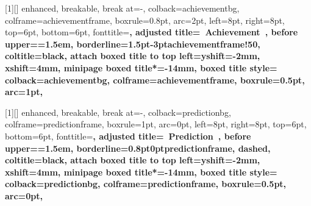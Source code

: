 

[1][]{%
  enhanced,
  breakable,
  break at=-\baselineskip,
  colback=achievementbg,
  colframe=achievementframe,
  boxrule=0.8pt,
  arc=2pt,
  left=8pt,
  right=8pt,
  top=6pt,
  bottom=6pt,
  fonttitle=\bfseries\sffamily,
  adjusted title={\achievementicon~Achievement~\theachievementcounter{}},
  before upper={\parindent=1.5em},
  borderline={1.5pt}{-3pt}{achievementframe!50},
  coltitle=black,
  attach boxed title to top left={yshift=-2mm, xshift=4mm},
  minipage boxed title*=-14mm,
  boxed title style={
    colback=achievementbg,
    colframe=achievementframe,
    boxrule=0.5pt,
    arc=1pt,
      }
}


[1][]{%
  enhanced,
  breakable,
  break at=-\baselineskip,
  colback=predictionbg,
  colframe=predictionframe,
  boxrule=1pt,
  arc=0pt,
  left=8pt,
  right=8pt,
  top=6pt,
  bottom=6pt,
  fonttitle=\bfseries\sffamily,
  adjusted title={\predictionicon~Prediction~\thepredictioncounter{}},
  before upper={\parindent=1.5em},
  borderline={0.8pt}{0pt}{predictionframe, dashed},
  coltitle=black,
  attach boxed title to top left={yshift=-2mm, xshift=4mm},
  minipage boxed title*=-14mm,
  boxed title style={
    colback=predictionbg,
    colframe=predictionframe,
    boxrule=0.5pt,
    arc=0pt,
      }
}

